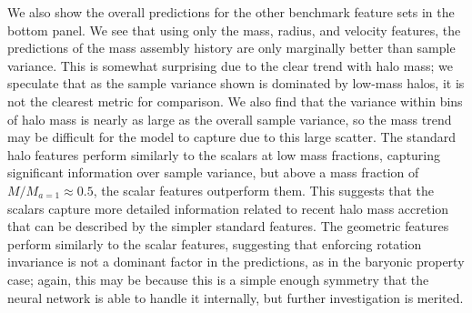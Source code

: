 We also show the overall predictions for the other benchmark feature sets in the bottom panel.
We see that using only the mass, radius, and velocity features, the predictions of the mass assembly history are only marginally better than sample variance.
This is somewhat surprising due to the clear trend with halo mass; we speculate that as the sample variance shown is dominated by low-mass halos, it is not the clearest metric for comparison.
We also find that the variance within bins of halo mass is nearly as large as the overall sample variance, so the mass trend may be difficult for the model to capture due to this large scatter.
The standard halo features perform similarly to the scalars at low mass fractions, capturing significant information over sample variance, but above a mass fraction of $M/M_{a=1} \approx 0.5$, the scalar features outperform them.
This suggests that the scalars capture more detailed information related to recent halo mass accretion that can be described by the simpler standard features.
The geometric features perform similarly to the scalar features, suggesting that enforcing rotation invariance is not a dominant factor in the predictions, as in the baryonic property case; again, this may be because this is a simple enough symmetry that the neural network is able to handle it internally, but further investigation is merited.

